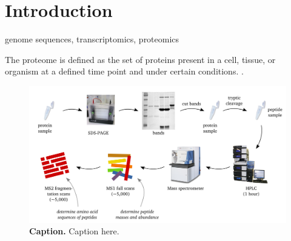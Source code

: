 \documentclass[11pt,a4paper,twoside]{report}
\renewcommand{\headrulewidth}{0.25pt}
\begin{document}


% 


\cleardoublepage
\setcounter{tocdepth}{2}
\setcounter{secnumdepth}{2}
\tableofcontents

\clearpage

\pagestyle{fancy}
 {
  \renewcommand{\headrulewidth}{0.25pt}
  \fancyhf{}
  \fancyhead[EL,OR]{\thepage}
}

\chapter{Introduction}


\begin{todo}
genome sequences, transcriptomics, proteomics
\end{todo}

The proteome is defined as the set of proteins present in a cell, tissue, or
organism at a defined time point and under certain conditions. \cite{Yarmush2002, Yates2009}.

\begin{figure}[h]
\includegraphics[width=\textwidth]{figures/Proteomics.jpg}
\caption{
{\bf Caption.} 
Caption here.
}
\label{fig:proteomics-overview}
\end{figure}
\end{document}
